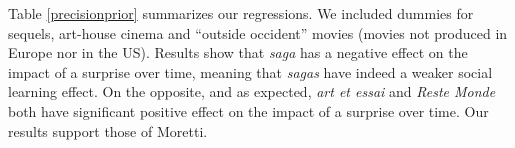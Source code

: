 Table \ref{precisionprior} summarizes our regressions. We included dummies for sequels, art-house cinema and ``outside occident'' movies (movies not produced in Europe nor in the US). Results show that \textit{saga} has a negative effect on the impact of a surprise over time, meaning that \textit{sagas} have indeed a weaker social learning effect. On the opposite, and as expected, \textit{art et essai} and \textit{Reste Monde} both have significant positive effect on the impact of a surprise over time. Our results support those of Moretti.
